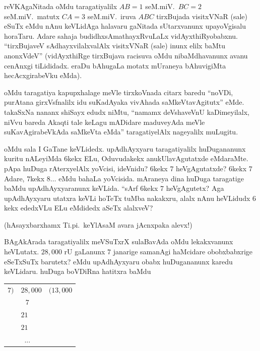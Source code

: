 
reVKAgaNitada oMdu taragatiyalilx $AB=1$ seM.miV.\ $BC=2$ seM.miV.\ matutx $CA=3$ seM.miV.\ iruva $ABC$ tirxBujada visitxVNaR (sale) eSuTx eMdu nAnu keVLidAga halavaru gaNitada sUtarxvanunx upayoVgisalu horaTaru. Adare sahaja budidhxsAmathayxRvuLaLx vidAyxthiRyobabxnu. ``tirxBujaveV sAdhayxvilalxvalAlx visitxVNaR (sale) inunx elilx baMtu anonxVdeV'' (vidAyxthiRge tirxBujava racisuva oMdu nibaMdhavanunx avanu cenAnxgi tiLididadx. eraDu bAhugaLa motatx mUraneya bAhuvigiMta hecAcxgirabeVku eMda).

oMdu taragatiya kapupxhalage meVle tirxkoVnada citarx baredu ``noVDi, purAtana girxVsfnalilx idu suKadAyaka vivAhada saMkeVtavAgitutx'' eMde. takaSxNa nananx shiSayx edudx niMtu, ``namamx deVshaveVnU kaDimeyilalx, niVvu bareda Akaqti tale keLagu mADidare maduveyAda meVle suKavAgirabeVkAda saMkeVta eMda'' taragatiyelAlx nageyalilx muLugitu.

oMdu sala I GaTane keVLidedx. upAdhAyxyaru taragatiyalilx huDugananunx kuritu nALeyiMda $6$kekx ELu, Oduvudakekx anukUlavAgutatxde eMdaraMte. pApa huDuga rAterxyelAlx yoVcisi, ideVnidu? $6$kekx $7$ heVgAgutatxde? $6$kekx $7$ Adare, $7$kekx $8\ldots$ eMdu bahaLa yoVcisida. mAraneya dina huDuga taragatige baMdu upAdhAyxyaranunx keVLida. ``sArf $6$kekx $7$ heVgAgutetx? Aga upAdhAyxyaru utatxra keVLi hoTeTx tuMba nakakxru, alalx nAnu heVLidudx $6$kekx ededxVLu  ELu eMdidedx aSeTx alalxveV?

(hAsayxbarxhamx Ti.pi.\ keYlAsaM avara jAcnxpaka alevx!)

\bigskip

\noindent
\begin{minipage}[c]{6cm}
\qquad BAgAkArada taragatiyalilx meVSuTxrX sulaBavAda oMdu lekakxvanunx heVLutatx. $28,000$ rU gaLanunx $7$ janarige samanAgi haMcidare obobxbabxrige eSeTxSuTx barutetx? eMdu upAdhAyxyaru obabx huDugananunx karedu keVLidaru. huDuga boVDiRna hatitxra baMdu
\end{minipage}
\quad
\begin{minipage}[c]{4cm}
\begin{center}
\begin{tabular}{r@{\,}l@{\,}l}
$7\Big)$ & $28,000$ & $\Big(13,000$\\
     & ~\,$7$ & \\
\cline{2-2}
     & $21$ &\\
     & $21$ &\\
\cline{2-2}
     & ~... &  
\end{tabular}
\end{center}
\end{minipage}


